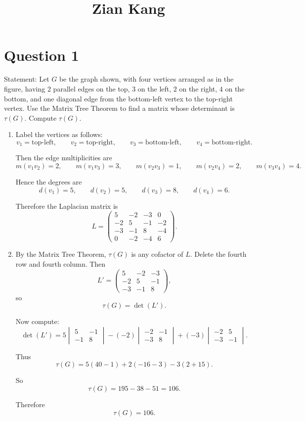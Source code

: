 \documentclass[11pt]{article}
\title{\vspace{-2cm} Zian Kang}
\date{}
\begin{document}
\maketitle

\section*{Question 1}

Statement: {Let $G$ be the graph shown, with four vertices arranged as in the figure, having $2$ parallel edges on the top, $3$ on the left, $2$ on the right, $4$ on the bottom, and one diagonal edge from the bottom-left vertex to the top-right vertex. Use the Matrix Tree Theorem to find a matrix whose determinant is $\tau(G)$. Compute $\tau(G)$.}

\medskip

\begin{enumerate}
    \item Label the vertices as follows:
\[
v_1=\text{top-left},\qquad
v_2=\text{top-right},\qquad
v_3=\text{bottom-left},\qquad
v_4=\text{bottom-right}.
\]

Then the edge multiplicities are
\[
m(v_1v_2)=2,\qquad
m(v_1v_3)=3,\qquad
m(v_2v_3)=1,\qquad
m(v_2v_4)=2,\qquad
m(v_3v_4)=4.
\]

Hence the degrees are
\[
d(v_1)=5,\qquad d(v_2)=5,\qquad d(v_3)=8,\qquad d(v_4)=6.
\]

Therefore the Laplacian matrix is
\[
L=
\begin{pmatrix}
5 & -2 & -3 & 0\\
-2 & 5 & -1 & -2\\
-3 & -1 & 8 & -4\\
0 & -2 & -4 & 6
\end{pmatrix}.
\]

\item By the Matrix Tree Theorem, $\tau(G)$ is any cofactor of $L$. Delete the fourth row and fourth column. Then
\[
L'=
\begin{pmatrix}
5 & -2 & -3\\
-2 & 5 & -1\\
-3 & -1 & 8
\end{pmatrix},
\]
so
\[
\tau(G)=\det(L').
\]

Now compute:
\[
\det(L')
=
5\begin{vmatrix}5&-1\\-1&8\end{vmatrix}
-(-2)\begin{vmatrix}-2&-1\\-3&8\end{vmatrix}
+(-3)\begin{vmatrix}-2&5\\-3&-1\end{vmatrix}.
\]

Thus
\[
\tau(G)
=
5(40-1)+2(-16-3)-3(2+15).
\]

So
\[
\tau(G)=195-38-51=106.
\]

Therefore
\[
\tau(G)=106.
\]
\end{enumerate}
\end{document}
